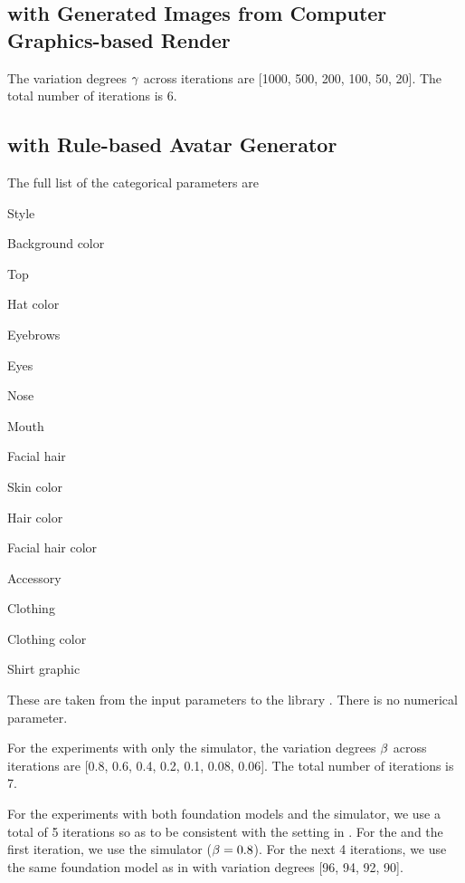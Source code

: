 \subsection{\celeba{} with Generated Images from Computer Graphics-based Render}

The variation degrees $\gamma$ across \pe{} iterations are [1000, 500, 200, 100, 50, 20]. The total number of \pe{} iterations is 6.

\subsection{\celeba{} with Rule-based Avatar Generator}

The full list of the categorical parameters are 
    \begin{packeditemize}
    \item Style
    \item Background color
    \item Top
    \item Hat color
    \item Eyebrows
    \item Eyes
    \item Nose
    \item Mouth
    \item Facial hair
    \item Skin color
    \item Hair color
    \item Facial hair color
    \item Accessory
    \item Clothing
    \item Clothing color
    \item Shirt graphic
\end{packeditemize}
These are taken from the input parameters to the library \cite{pythonavatar}. There is no numerical parameter. 

For the experiments with only the simulator,
the variation degrees $\beta$ across \pe{} iterations are [0.8, 0.6, 0.4, 0.2, 0.1, 0.08, 0.06].
The total number of \pe{} iterations is 7.

For the experiments with both foundation models and the simulator, we use a total of 5 \pe{} iterations so as to be consistent with the setting in \citet{dpimagebench}.
For the \randomsampleapiname{} and the first \pe{} iteration, we use the simulator ($\beta=0.8$). For the next 4 \pe{} iterations, we use the same foundation model as in \citet{lin2023differentially} with variation degrees [96, 94, 92, 90].


